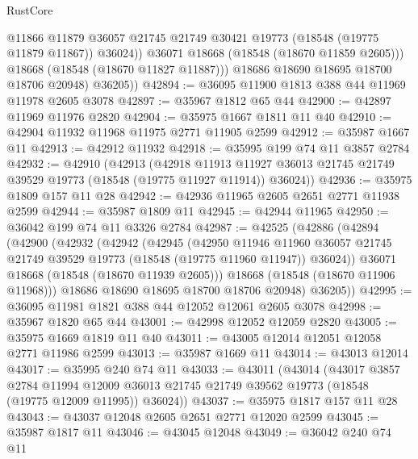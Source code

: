 \begin{lexlean}{RustCore}
\begin{coremodule}
                  @11866
                  @11879
                  @36057
                  @21745
                  @21749
                  @30421
                  @19773
                  (@18548 (@19775 @11879 @11867))
                  @36024))
              @36071
              @18668
              (@18548 (@18670 @11859 @2605)))
            @18668
            (@18548 (@18670 @11827 @11887)))
          @18686
          @18690
          @18695
          @18700
          @18706
          @20948)
        @36205))
@42894 := @36095 @11900 @1813 @388 @44 @11969 @11978 @2605 @3078
@42897 := @35967 @1812 @65 @44
@42900 := @42897 @11969 @11976 @2820
@42904 := @35975 @1667 @1811 @11 @40
@42910 := @42904 @11932 @11968 @11975 @2771 @11905 @2599
@42912 := @35987 @1667 @11
@42913 := @42912 @11932
@42918 := @35995 @199 @74 @11 @3857 @2784
@42932 := @42910
    (@42913
      (@42918
        @11913
        @11927
        @36013
        @21745
        @21749
        @39529
        @19773
        (@18548 (@19775 @11927 @11914))
        @36024))
@42936 := @35975 @1809 @157 @11 @28
@42942 := @42936 @11965 @2605 @2651 @2771 @11938 @2599
@42944 := @35987 @1809 @11
@42945 := @42944 @11965
@42950 := @36042 @199 @74 @11 @3326 @2784
@42987 := @42525
    (@42886
      (@42894
        (@42900
          (@42932
            (@42942
              (@42945
                (@42950
                  @11946
                  @11960
                  @36057
                  @21745
                  @21749
                  @39529
                  @19773
                  (@18548 (@19775 @11960 @11947))
                  @36024))
              @36071
              @18668
              (@18548 (@18670 @11939 @2605)))
            @18668
            (@18548 (@18670 @11906 @11968)))
          @18686
          @18690
          @18695
          @18700
          @18706
          @20948)
        @36205))
@42995 := @36095 @11981 @1821 @388 @44 @12052 @12061 @2605 @3078
@42998 := @35967 @1820 @65 @44
@43001 := @42998 @12052 @12059 @2820
@43005 := @35975 @1669 @1819 @11 @40
@43011 := @43005 @12014 @12051 @12058 @2771 @11986 @2599
@43013 := @35987 @1669 @11
@43014 := @43013 @12014
@43017 := @35995 @240 @74 @11
@43033 := @43011
    (@43014
      (@43017
        @3857
        @2784
        @11994
        @12009
        @36013
        @21745
        @21749
        @39562
        @19773
        (@18548 (@19775 @12009 @11995))
        @36024))
@43037 := @35975 @1817 @157 @11 @28
@43043 := @43037 @12048 @2605 @2651 @2771 @12020 @2599
@43045 := @35987 @1817 @11
@43046 := @43045 @12048
@43049 := @36042 @240 @74 @11

\end{coremodule}
\end{lexlean}
